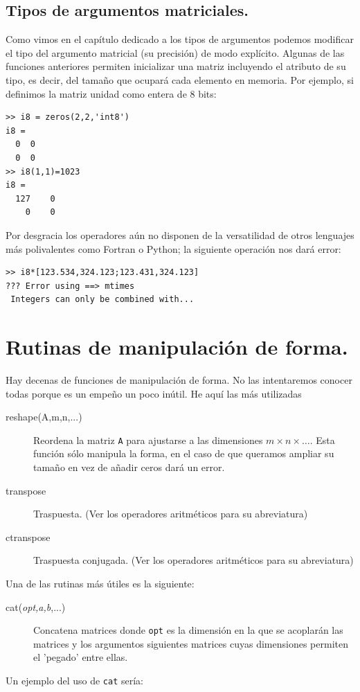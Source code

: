 \subsection{Tipos de argumentos matriciales.}

Como vimos en el capítulo dedicado a los tipos de argumentos podemos
modificar el tipo del argumento matricial (su precisión) de modo explícito.
Algunas de las funciones anteriores permiten inicializar una matriz
incluyendo el atributo de su tipo, es decir, del tamaño que ocupará
cada elemento en memoria. Por ejemplo, si definimos la matriz unidad
como entera de 8 bits:

\begin{verbatim}
>> i8 = zeros(2,2,'int8')
i8 =
  0  0
  0  0
>> i8(1,1)=1023
i8 =
  127    0
    0    0
 \end{verbatim}
Por desgracia los operadores aún no disponen de la versatilidad de
otros lenguajes más polivalentes como Fortran o Python; la siguiente
operación nos dará error:

\begin{verbatim}
>> i8*[123.534,324.123;123.431,324.123]
??? Error using ==> mtimes
 Integers can only be combined with...
\end{verbatim}

\section{Rutinas de manipulación de forma.}

Hay decenas de funciones de manipulación de forma. No las intentaremos
conocer todas porque es un empeño un poco inútil. He aquí las más
utilizadas

\begin{description}
\item [reshape(A,m,n,...)]Reordena la matriz \texttt{A}
para ajustarse a las dimensiones $m\times n\times\ldots$. Esta función
sólo manipula la forma, en el caso de que queramos ampliar su tamaño
en vez de añadir ceros dará un error.
\item [transpose\texttt{}]Traspuesta. (Ver los operadores
aritméticos para su abreviatura)
\item [ctranspose\texttt{}]Traspuesta conjugada. (Ver
los operadores aritméticos para su abreviatura)
\end{description}
Una de las rutinas más útiles es la siguiente:

\begin{description}
\item [cat(\emph{opt,a,b},...)]Concatena matrices donde \texttt{opt} es
la dimensión en la que se acoplarán las matrices y los argumentos
siguientes matrices cuyas dimensiones permiten el 'pegado' entre ellas.
\end{description}
Un ejemplo del uso de \texttt{cat} sería:

